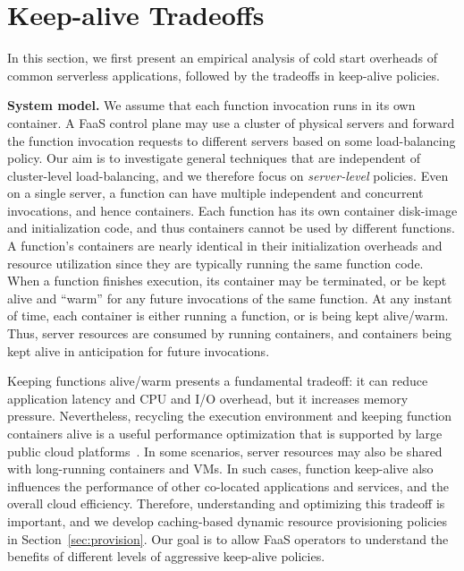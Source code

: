\section{Keep-alive Tradeoffs}
\label{sec:tradeoffs}


In this section, we first present an empirical analysis of cold start overheads of common serverless applications, followed by the tradeoffs in keep-alive policies. 

\noindent \textbf{System model.} 
We assume that each function invocation runs in its own container. 
%
A FaaS control plane may use a cluster of physical servers and forward the function invocation requests to different servers based on some load-balancing policy. 
Our aim is to investigate general techniques that are independent of cluster-level load-balancing, and we therefore focus on \emph{server-level} policies. 
Even on a single server, a function can have multiple independent and concurrent invocations, and hence containers. 
Each function has its own container disk-image and initialization code, and thus containers cannot be used by different functions. 
A function's containers are nearly identical in their initialization overheads and resource utilization since they are typically running the same function code. 
%
When a function finishes execution, its container may be terminated, or be kept alive and ``warm'' for any future invocations of the same function. 
%
At any instant of time, each container is either running a function, or is being kept alive/warm. %
%
Thus, server resources are consumed by running containers, and containers being kept alive in anticipation for future invocations. 


Keeping functions alive/warm presents a fundamental tradeoff: it can reduce application latency and CPU and I/O overhead, but it increases memory pressure. 
Nevertheless, recycling the execution environment and keeping function containers alive is a useful performance optimization that is supported by large public cloud platforms~\cite{goog-functions-tricks,aws-warm-predictable,azure-warmup-trigger}. 
%
In some scenarios, server resources may also be shared with long-running containers and VMs. 
In such cases, function keep-alive also influences the performance of other co-located applications and services, and the overall cloud efficiency. 
Therefore, understanding and optimizing this tradeoff is important, and we develop caching-based dynamic resource provisioning policies in Section~\ref{sec:provision}. 
Our goal is to allow FaaS operators to understand the benefits of different levels of aggressive keep-alive policies. 



